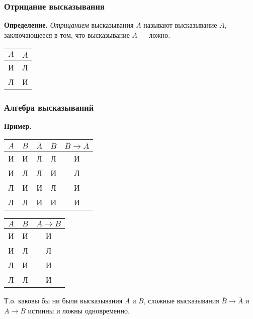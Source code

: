 \documentclass{article}
\begin{document}
    \subsubsection{Отрицание высказывания}

    \textbf{Определение.} \textit{Отрицанием} высказывания \(A\) называют высказывание \(\overline{A}\), заключающееся в том, что высказывание \(A\) --- ложно.

    \begin{center}
        \begin{tabular}{||c | c||}
            \hline
            \(A\) & \(\overline{A}\)\\
            \hline \hline
            И & Л\\
            \hline
            Л & И\\
            \hline
        \end{tabular}
    \end{center}

    \subsubsection{Алгебра высказываний}

    \textbf{Пример.}

    \begin{tabular}{||c | c | c | c | c||}
        \hline
        \(A\) &  \(B\) & \(\overline{A}\) & \(\overline{B}\) & \(\overline{B} \rightarrow \overline{A}\)\\
        \hline \hline
        И & И & Л & Л & И\\
        \hline
        И & Л & Л & И & Л\\
        \hline
        Л & И & И & Л & И\\
        \hline
        Л & Л & И & И & И\\
        \hline
    \end{tabular} \qquad
    \begin{tabular}{||c | c | c||}
        \hline
        \(A\) &  \(B\) & \(A \rightarrow B\)\\
        \hline \hline
        И & И & И\\
        \hline
        И & Л & Л\\
        \hline
        Л & И & И\\
        \hline
        Л & Л & И\\
        \hline
    \end{tabular}

    Т.о. каковы бы ни были высказывания \(A\) и \(B\), сложные высказывания \(\overline{B} \rightarrow \overline{A}\) и \(A \rightarrow B\) истинны и ложны одновременно.
\end{document}
